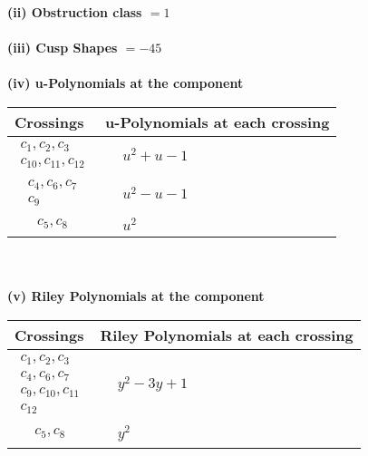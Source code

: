 \documentclass[1p]{elsarticle_modified}
\theoremstyle{definition}
\begin{document}
\flushleft \textbf{(ii) Obstruction class $= 1$}\\~\\
\flushleft \textbf{(iii) Cusp Shapes $= -45$}\\~\\
\newpage\renewcommand{\arraystretch}{1}
\flushleft \textbf{(iv) u-Polynomials at the component}\newline \\
\begin{tabular}{m{50pt}|m{274pt}}
Crossings & \hspace{64pt}u-Polynomials at each crossing \\
\hline $$\begin{aligned}c_{1},c_{2},c_{3}\\c_{10},c_{11},c_{12}\end{aligned}$$&$\begin{aligned}
&u^2+u-1
\end{aligned}$\\
\hline $$\begin{aligned}c_{4},c_{6},c_{7}\\c_{9}\end{aligned}$$&$\begin{aligned}
&u^2- u-1
\end{aligned}$\\
\hline $$\begin{aligned}c_{5},c_{8}\end{aligned}$$&$\begin{aligned}
&u^2
\end{aligned}$\\
\hline
\end{tabular}\\~\\
\newpage\renewcommand{\arraystretch}{1}
\flushleft \textbf{(v) Riley Polynomials at the component}\newline \\
\begin{tabular}{m{50pt}|m{274pt}}
Crossings & \hspace{64pt}Riley Polynomials at each crossing \\
\hline $$\begin{aligned}c_{1},c_{2},c_{3}\\c_{4},c_{6},c_{7}\\c_{9},c_{10},c_{11}\\c_{12}\end{aligned}$$&$\begin{aligned}
&y^2-3 y+1
\end{aligned}$\\
\hline $$\begin{aligned}c_{5},c_{8}\end{aligned}$$&$\begin{aligned}
&y^2
\end{aligned}$\\
\hline
\end{tabular}\\~\\
\end{document}
